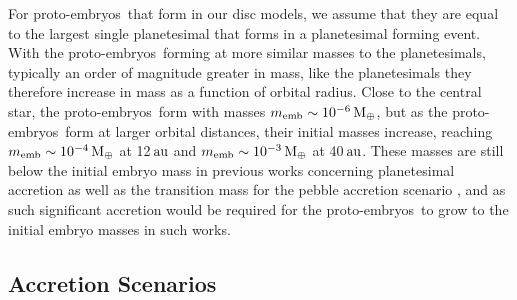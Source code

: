 \documentclass[a4paper,fleqn,usenatbib]{mnras}
\newcommand{\me}{{\, {\rm M}_{\oplus}}}
\newcommand{\au}{{\, {\rm au}}}
\newcommand{\embs}{{{proto-embryos~}}}
\begin{document}
For \embs that form in our disc models, we assume that they are equal to the largest single planetesimal that forms in a planetesimal forming event.
With the \embs forming at more similar masses to the planetesimals, typically an order of magnitude greater in mass, like the planetesimals they therefore increase in mass as a function of orbital radius.
Close to the central star, the \embs form with masses $m_{\rm emb}\sim 10^{-6}\me$, but as the \embs form at larger orbital distances, their initial masses increase, reaching $m_{\rm emb}\sim 10^{-4}\me$ at 12$\au$ and $m_{\rm emb}\sim 10^{-3}\me$ at 40$\au$.
These masses are still below the initial embryo mass in previous works concerning planetesimal accretion \citep[e.g.][]{Mords09,ColemanNelson14,Mordasini15,ColemanNelson16,ColemanNelson16b} as well as the transition mass for the pebble accretion scenario \citep[e.g.][]{Bitsch15,Lambrechts19}, and as such significant accretion would be required for the \embs to grow to the initial embryo masses in such works.

\subsection{Accretion Scenarios}
\end{document}

